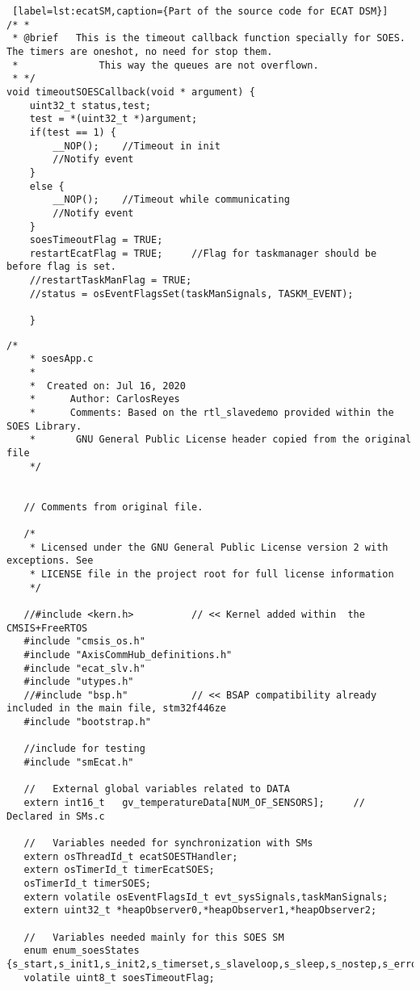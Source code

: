 \begin{lstlisting} [label=lst:ecatSM,caption={Part of the source code for ECAT DSM}]
/* *
 * @brief	This is the timeout callback function specially for SOES. The timers are oneshot, no need for stop them.
 * 				This way the queues are not overflown.
 * */
void timeoutSOESCallback(void * argument) {
	uint32_t status,test;
	test = *(uint32_t *)argument;
	if(test == 1) {
		__NOP();	//Timeout in init
		//Notify event
	}
	else {
		__NOP();	//Timeout while communicating
		//Notify event
	}
	soesTimeoutFlag = TRUE;
	restartEcatFlag = TRUE;		//Flag for taskmanager should be before flag is set.
	//restartTaskManFlag = TRUE;
	//status = osEventFlagsSet(taskManSignals, TASKM_EVENT);

	}

\end{lstlisting}


\begin{lstlisting}[label=lst:soesAPP DSM,caption={Source code for SOES APP DSM}]
    /*
    * soesApp.c
    *
    *  Created on: Jul 16, 2020
    *      Author: CarlosReyes
    *      Comments: Based on the rtl_slavedemo provided within the SOES Library.
    *      	GNU General Public License header copied from the original file
    */
   
   
   // Comments from original file.
   
   /*
    * Licensed under the GNU General Public License version 2 with exceptions. See
    * LICENSE file in the project root for full license information
    */
   
   //#include <kern.h>			// << Kernel added within  the CMSIS+FreeRTOS
   #include "cmsis_os.h"
   #include "AxisCommHub_definitions.h"
   #include "ecat_slv.h"
   #include "utypes.h"
   //#include "bsp.h"			// << BSAP compatibility already included in the main file, stm32f446ze
   #include "bootstrap.h"
   
   //include for testing
   #include "smEcat.h"
   
   //	External global variables related to DATA
   extern int16_t	gv_temperatureData[NUM_OF_SENSORS];		//	Declared in SMs.c
   
   //	Variables needed for synchronization with SMs
   extern osThreadId_t ecatSOESTHandler;
   extern osTimerId_t timerEcatSOES;
   osTimerId_t timerSOES;
   extern volatile osEventFlagsId_t evt_sysSignals,taskManSignals;
   extern uint32_t *heapObserver0,*heapObserver1,*heapObserver2;
   
   //	Variables needed mainly for this SOES SM
   enum enum_soesStates {s_start,s_init1,s_init2,s_timerset,s_slaveloop,s_sleep,s_nostep,s_error}soes_step;
   volatile uint8_t soesTimeoutFlag;
   

\end{lstlisting}

